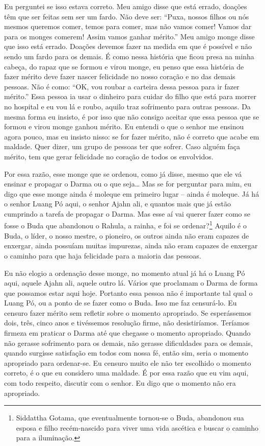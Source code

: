 Eu perguntei se isso estava correto. Meu amigo disse que está
errado, doações têm que ser feitas sem ser um fardo. Não deve ser:
“Puxa, nossos filhos ou nós mesmos queremos comer, temos para comer,
mas não vamos comer! Vamos dar para os monges comerem! Assim vamos
ganhar mérito.” Meu amigo monge disse que isso está errado. Doações
devemos fazer na medida em que é possível e não sendo um fardo para os
demais. É como nessa história que ficou presa na minha cabeça, do rapaz
que se formou e virou monge, eu penso que essa história de fazer mérito
deve fazer nascer felicidade no nosso coração e no das demais pessoas.
Não é como: “OK, vou roubar a carteira dessa pessoa para ir fazer
mérito.” Essa pessoa ia usar o dinheiro para cuidar do filho que está
para morrer no hospital e eu vou lá e roubo, aquilo traz sofrimento
para outras pessoas. Da mesma forma eu insisto, é por isso que não
consigo aceitar que essa pessoa que se formou e virou monge ganhou
mérito. Eu entendi o que o senhor me ensinou agora pouco, mas eu
insisto nisso: se for fazer mérito, não é correto que acabe em maldade.
Quer dizer, um grupo de pessoas ter que sofrer. Caso alguém faça
mérito, tem que gerar felicidade no coração de todos os envolvidos. 

Por essa razão, esse monge que se ordenou, como já disse, mesmo que
ele vá ensinar e propagar o Darma ou o que seja\ldots{} Mas se for perguntar
para mim, eu digo que esse monge ainda é moleque em primeiro lugar –
ainda é moleque. Já há o senhor Luang Pó aqui, o senhor Ajahn ali, e
quantos mais que já estão cumprindo a tarefa de propagar o Darma. Mas
esse aí vai querer fazer como se fosse o Buda que abandonou o Rahula, a
rainha, e foi se ordenar?\footnote{Siddattha Gotama, que eventualmente
tornou-se o Buda, abandonou sua esposa e filho recém-nascido para viver
uma vida ascética e buscar o caminho para a iluminação.} Aquilo é o
Buda, o líder, o nosso mestre, o pioneiro, os outros ainda não eram
capazes de enxergar, ainda possuíam muitas impurezas, ainda não eram
capazes de enxergar o caminho para que haja felicidade para a maioria
das pessoas. 

Eu não elogio a ordenação desse monge, no momento atual já há o
Luang Pó aqui, aquele Ajahn ali, aquele outro lá. Vários que proclamam
o Darma de forma que possamos estar aqui hoje. Portanto essa pessoa não
é importante tal qual o Luang Pó, ou a ponto de se fazer como o Buda.
Isso me faz censurá-lo. Eu censuro fazer mérito sem refletir sobre o
momento apropriado. Se esperássemos dois, três, cinco anos e tivéssemos
resolução firme, não desistiríamos. Teríamos firmeza em praticar o
Darma até que chegasse o momento apropriado. Quando não gerasse
sofrimento para os demais, não gerasse dificuldades para os demais,
quando surgisse satisfação em todos com nossa fé, então sim, seria o
momento apropriado para ordenar-se. Eu censuro muito ele não ter
escolhido o momento correto, é o que eu considero uma maldade. É por
essa razão que eu vim aqui, com todo respeito, discutir com o senhor.
Eu digo que o momento não era apropriado.


